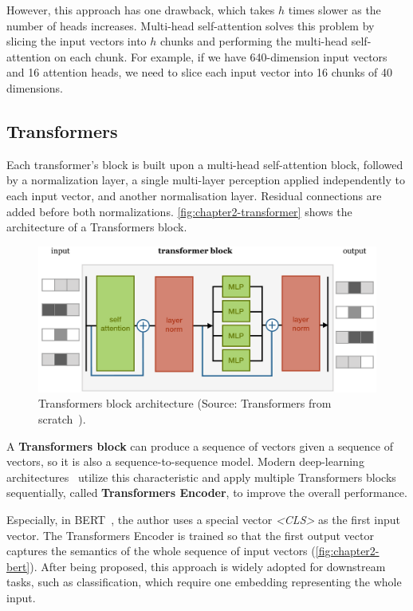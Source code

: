 However, this approach has one drawback, which takes $h$ times slower as the number of heads increases. Multi-head self-attention solves this problem by slicing the input vectors into $h$ chunks and performing the multi-head self-attention on each chunk. For example, if we have 640-dimension input vectors and 16 attention heads, we need to slice each input vector into 16 chunks of 40 dimensions. 

\subsection{Transformers}

Each transformer's block is built upon a multi-head self-attention block, followed by a normalization layer, a single multi-layer perception applied independently to each input vector, and another normalisation layer. Residual connections are added before both normalizations. \autoref{fig:chapter2-transformer} shows the architecture of a Transformers block.

\begin{figure}[h!]
    \centering
    \includegraphics[width=\linewidth]{content/resources/images/background/transformers.PNG}
    \caption{Transformers block architecture (Source: Transformers from scratch~\cite{web-transform-from-scratch}).}
    \label{fig:chapter2-transformer}
\end{figure}

A \textbf{Transformers block} can produce a sequence of vectors given a sequence of vectors, so it is also a sequence-to-sequence model. Modern deep-learning architectures~\cite{Vaswani-NeurIPS2017-Attention, Devlin-ArXiv2018-BERT} utilize this characteristic and apply multiple Transformers blocks sequentially, called \textbf{Transformers Encoder}, to improve the overall performance.

Especially, in BERT~\cite{Devlin-ArXiv2018-BERT}, the author uses a special vector \textit{<CLS>} as the first input vector. The Transformers Encoder is trained so that the first output vector captures the semantics of the whole sequence of input vectors (\autoref{fig:chapter2-bert}). After being proposed, this approach is widely adopted for downstream tasks, such as classification, which require one embedding representing the whole input.

